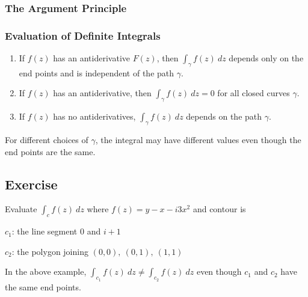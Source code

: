 \subsubsection{The Argument Principle}
\subsubsection{Evaluation of Definite Integrals}





\begin{enumerate}
	\item If $f(z)$ has an antiderivative $F(z)$, then $\int_\gamma f(z)\ dz$ depends only on the end points and is independent of the path $\gamma$.
	\item If $f(z)$ has an antiderivative, then $\int_\gamma f(z)\ dz = 0$ for all closed curves $\gamma$.
	\item If $f(z)$ has no antiderivatives, $\int_\gamma f(z)\ dz$ depends on the path $\gamma$.
\end{enumerate}

	For different choices of $\gamma$, the integral may have different values even though the end points are the same.

\subsection{Exercise}
Evaluate $\int_c f(z)\ dz$ where $f(z) = y-x-i3x^2$ and contour is
\begin{itemize*}
	\item[$c_1$:]the line segment $0$ and $i+1$
	\item[$c_2$:] the polygon joining $(0,0),\ (0,1),\ (1,1)$ 
\end{itemize*}
In the above example, $\int_{c_1} f(z)\ dz \ne \int_{c_2}f(z)\ dz$ even though $c_1$ and $c_2$ have the same end points.

